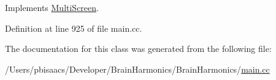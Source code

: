 Implements \hyperlink{class_multi_screen_a76ec369d025ed4dafdf81fdf5100937b}{Multi\+Screen}.



Definition at line 925 of file main.\+cc.



The documentation for this class was generated from the following file\+:\begin{DoxyCompactItemize}
\item 
/\+Users/pbisaacs/\+Developer/\+Brain\+Harmonics/\+Brain\+Harmonics/\hyperlink{main_8cc}{main.\+cc}\end{DoxyCompactItemize}
